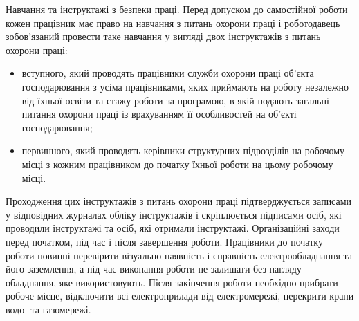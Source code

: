 \documentclass[12pt,a4paper]{article}
\begin{document}
Навчання та інструктажі з безпеки праці. Перед допуском до самостійної роботи кожен працівник має право на навчання з питань охорони праці і роботодавець зобов’язаний провести таке навчання у вигляді двох інструктажів з питань охорони праці:
\begin{itemize}
\item вступного, який проводять працівники служби охорони праці об’єкта господарювання з усіма працівниками, яких приймають на роботу незалежно від їхньої освіти та стажу роботи за програмою, в якій подають загальні питання охорони праці із врахуванням її особливостей на об’єкті господарювання;
\item первинного, який проводять керівники структурних підрозділів на робочому місці з кожним працівником до початку їхньої роботи на цьому робочому місці.
\end{itemize}
Проходження цих інструктажів з питань охорони праці підтверджується записами у відповідних журналах обліку інструктажів і скріплюється підписами осіб, які проводили інструктажі та осіб, які отримали інструктажі.
Організаційні заходи перед початком, під час і після завершення роботи.
Працівники до початку роботи повинні перевірити візуально наявність і справність електрообладнання та його заземлення, а під час виконання роботи не залишати без нагляду обладнання, яке використовують. Після закінчення роботи необхідно прибрати робоче місце, відключити всі електроприлади від електромережі, перекрити крани водо- та газомережі.
\end{document}

